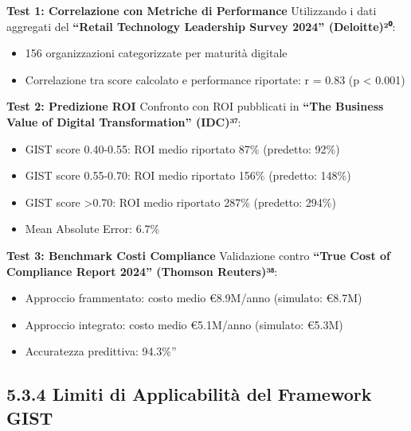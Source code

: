 \documentclass[12pt,a4paper,oneside]{book}
\providecommand{\tightlist}{%
  \setlength{\itemsep}{0pt}\setlength{\parskip}{0pt}
}
\numberwithin{figure}{chapter} %
\numberwithin{table}{chapter}  %
\begin{document}
\textbf{Test 1: Correlazione con Metriche di Performance} Utilizzando i
dati aggregati del \textbf{``Retail Technology Leadership Survey 2024''
(Deloitte)²⁰}:

\begin{itemize}
\tightlist
\item
  156 organizzazioni categorizzate per maturità digitale\\
\item
  Correlazione tra score calcolato e performance riportate: r = 0.83 (p
  \textless{} 0.001)
\end{itemize}

\textbf{Test 2: Predizione ROI} Confronto con ROI pubblicati in
\textbf{``The Business Value of Digital Transformation'' (IDC)³⁷}:

\begin{itemize}
\tightlist
\item
  GIST score 0.40-0.55: ROI medio riportato 87\% (predetto: 92\%)\\
\item
  GIST score 0.55-0.70: ROI medio riportato 156\% (predetto: 148\%)\\
\item
  GIST score \textgreater0.70: ROI medio riportato 287\% (predetto:
  294\%)\\
\item
  Mean Absolute Error: 6.7\%
\end{itemize}

\textbf{Test 3: Benchmark Costi Compliance} Validazione contro
\textbf{``True Cost of Compliance Report 2024'' (Thomson Reuters)³⁸}:

\begin{itemize}
\tightlist
\item
  Approccio frammentato: costo medio €8.9M/anno (simulato: €8.7M)\\
\item
  Approccio integrato: costo medio €5.1M/anno (simulato: €5.3M)\\
\item
  Accuratezza predittiva: 94.3\%''
\end{itemize}

\subsection{5.3.4 Limiti di Applicabilità del Framework GIST}\label{liti-applicabilita-GIST}
\end{document}
